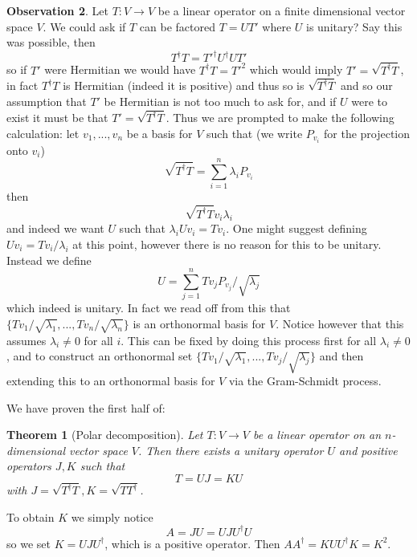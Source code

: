\documentclass[12pt]{article}
\theoremstyle{plain}
\newtheorem{thm}{Theorem}[subsection] %
\theoremstyle{definition}
\newtheorem{observation}[thm]{Observation}
\newcommand{\lto}{\longrightarrow}
\begin{document}
\begin{observation}
	Let $T: V \lto V$ be a linear operator on a finite dimensional vector space $V$. We could ask if $T$ can be factored $T = UT'$ where $U$ is unitary? Say this was possible, then
	\begin{equation}
		T^\dagger T = T'^\dagger U^\dagger U T'
	\end{equation}
	so if $T'$ were Hermitian we would have $T^\dagger T = T'^2$ which would imply $T' = \sqrt{T^\dagger T}$, in fact $T^\dagger T$ is Hermitian (indeed it is positive) and thus so is $\sqrt{T^\dagger T}$ and so our assumption that $T'$ be Hermitian is not too much to ask for, and if $U$ were to exist it must be that $T' = \sqrt{T^\dagger T}$. Thus we are prompted to make the following calculation: let $v_1,...,v_n$ be a basis for $V$ such that (we write $P_{v_i}$ for the projection onto $v_i$)
	\begin{equation}
		\sqrt{T^\dagger T} = \sum_{i = 1}^n \lambda_i P_{v_i}
	\end{equation}
	then
	\begin{equation}
		\sqrt{T^\dagger T}v_i \lambda_i
	\end{equation}
	and indeed we want $U$ such that $\lambda_i Uv_i = Tv_i$. One might suggest defining $Uv_i = Tv_i/\lambda_i$ at this point, however there is no reason for this to be unitary. Instead we define
	\begin{equation}
		U = \sum_{j = 1}^n Tv_jP_{v_j}/\sqrt{\lambda_j}
	\end{equation}
	which indeed is unitary.  In fact we read off from this that $\lbrace Tv_1/\sqrt{\lambda_1},...,Tv_n/\sqrt{\lambda_n}\rbrace$ is an orthonormal basis for $V$. Notice however that this assumes $\lambda_i \neq 0$ for all $i$. This can be fixed by doing this process first for all $\lambda_i \neq 0$, and to construct an orthonormal set $\lbrace Tv_1/\sqrt{\lambda_1},...,Tv_j/\sqrt{\lambda_j}\rbrace$ and then extending this to an orthonormal basis for $V$ via the Gram-Schmidt process.
	
	We have proven the first half of:
	\begin{thm}[Polar decomposition]\label{thm:polar_decomp}
		Let $T: V \lto V$ be a linear operator on an $n$-dimensional vector space $V$. Then there exists a unitary operator $U$ and positive operators $J,K$ such that
		\begin{equation}
			T = UJ = KU
		\end{equation}
		with $J = \sqrt{T^\dagger T}, K = \sqrt{TT^\dagger}$.
	\end{thm}
	To obtain $K$ we simply notice
	\begin{equation}
		A = JU = UJU^\dagger  U
	\end{equation}
	so we set $K = UJU^\dagger$, which is a positive operator. Then $AA^\dagger = KUU^\dagger K = K^2$.
\end{observation}
\end{document}
